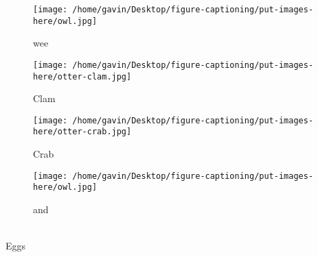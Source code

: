 
                \begin{figure}
                  \caption{wee}
                  \begin{center}
                    \texttt{[image: /home/gavin/Desktop/figure-captioning/put-images-here/owl.jpg]}
                    \label{fig:owl}
                  \end{center}
                \end{figure}
                \begin{figure}
                  \caption{Clam}
                  \begin{center}
                    \texttt{[image: /home/gavin/Desktop/figure-captioning/put-images-here/otter-clam.jpg]}
                    \label{fig:otter-clam}
                  \end{center}
                \end{figure}
                \begin{figure}
                  \caption{Crab}
                  \begin{center}
                    \texttt{[image: /home/gavin/Desktop/figure-captioning/put-images-here/otter-crab.jpg]}
                    \label{fig:otter-crab}
                  \end{center}
                \end{figure}
\begin{figure}
\caption{and}
\begin{center}
\texttt{[image: /home/gavin/Desktop/figure-captioning/put-images-here/owl.jpg]}
\label{fig:owl}
\end{center}
\end{figure}
\\Eggs